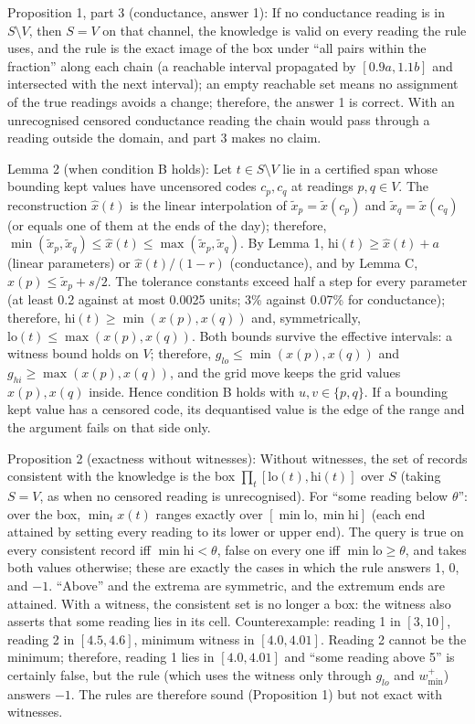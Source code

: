 Proposition 1, part 3 (conductance, answer 1): If no conductance reading is in $S \setminus V$, then $S = V$ on that channel, the knowledge is valid on every reading the rule uses, and the rule is the exact image of the box under ``all pairs within the fraction'' along each chain (a reachable interval propagated by $[0.9a, 1.1b]$ and intersected with the next interval); an empty reachable set means no assignment of the true readings avoids a change; therefore, the answer 1 is correct. With an unrecognised censored conductance reading the chain would pass through a reading outside the domain, and part 3 makes no claim.

Lemma 2 (when condition B holds): Let $t \in S \setminus V$ lie in a certified span whose bounding kept values have uncensored codes $c_p, c_q$ at readings $p, q \in V$. The reconstruction $\hat{x}(t)$ is the linear interpolation of $\tilde{x}_p = \tilde{x}(c_p)$ and $\tilde{x}_q = \tilde{x}(c_q)$ (or equals one of them at the ends of the day); therefore, $\min(\tilde{x}_p, \tilde{x}_q) \le \hat{x}(t) \le \max(\tilde{x}_p, \tilde{x}_q)$. By Lemma 1, $\mathrm{hi}(t) \ge \hat{x}(t) + a$ (linear parameters) or $\hat{x}(t)/(1-r)$ (conductance), and by Lemma C, $x(p) \le \tilde{x}_p + s/2$. The tolerance constants exceed half a step for every parameter (at least 0.2 against at most 0.0025 units; 3\% against 0.07\% for conductance); therefore, $\mathrm{hi}(t) \ge \min(x(p), x(q))$ and, symmetrically, $\mathrm{lo}(t) \le \max(x(p), x(q))$. Both bounds survive the effective intervals: a witness bound holds on $V$; therefore, $g_{lo} \le \min(x(p), x(q))$ and $g_{hi} \ge \max(x(p), x(q))$, and the grid move keeps the grid values $x(p), x(q)$ inside. Hence condition B holds with $u, v \in \{p, q\}$. If a bounding kept value has a censored code, its dequantised value is the edge of the range and the argument fails on that side only.

Proposition 2 (exactness without witnesses): Without witnesses, the set of records consistent with the knowledge is the box $\prod_t [\mathrm{lo}(t), \mathrm{hi}(t)]$ over $S$ (taking $S = V$, as when no censored reading is unrecognised). For ``some reading below $\theta$'': over the box, $\min_t x(t)$ ranges exactly over $[\min \mathrm{lo}, \min \mathrm{hi}]$ (each end attained by setting every reading to its lower or upper end). The query is true on every consistent record iff $\min \mathrm{hi} < \theta$, false on every one iff $\min \mathrm{lo} \ge \theta$, and takes both values otherwise; these are exactly the cases in which the rule answers 1, 0, and $-1$. ``Above'' and the extrema are symmetric, and the extremum ends are attained. With a witness, the consistent set is no longer a box: the witness also asserts that some reading lies in its cell. Counterexample: reading 1 in $[3, 10]$, reading 2 in $[4.5, 4.6]$, minimum witness in $[4.0, 4.01]$. Reading 2 cannot be the minimum; therefore, reading 1 lies in $[4.0, 4.01]$ and ``some reading above 5'' is certainly false, but the rule (which uses the witness only through $g_{lo}$ and $w^{+}_{\min}$) answers $-1$. The rules are therefore sound (Proposition 1) but not exact with witnesses.

